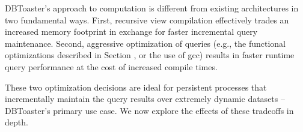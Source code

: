 %


DBToaster's approach to computation is different from existing architectures in two fundamental ways.  First, recursive view compilation effectively trades an increased memory footprint in exchange for faster incremental query maintenance.  Second, aggressive optimization of queries (e.g., the functional optimizations described in Section , or the use of gcc) results in faster runtime query performance at the cost of increased compile times.

These two optimization decisions are ideal for persistent processes that incrementally maintain the query results over extremely dynamic datasets -- DBToaster's primary use case.  We now explore the effects of these tradeoffs in depth.  


